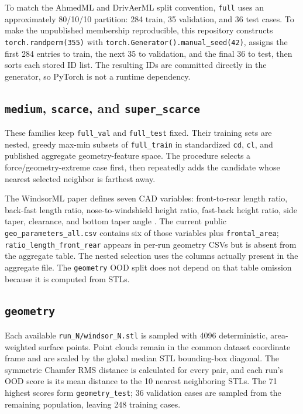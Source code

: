 \documentclass[10pt]{article}
\newcommand{\code}[1]{\texttt{#1}}
\newcommand{\splitkey}[1]{\texttt{#1}}
\begin{document}
To match the AhmedML and DrivAerML split convention, \splitkey{full} uses an
approximately 80/10/10 partition: 284 train, 35 validation, and 36 test cases.
To make the unpublished membership reproducible, this repository constructs
\code{torch.randperm(355)} with \code{torch.Generator().manual\_seed(42)}, assigns
the first 284 entries to train, the next 35 to validation, and the final 36 to
test, then sorts each stored ID list. The resulting IDs are committed directly
in the generator, so PyTorch is not a runtime dependency.

\subsection*{\splitkey{medium}, \splitkey{scarce}, and \splitkey{super\_scarce}}

These families keep \splitkey{full\_val} and \splitkey{full\_test} fixed. Their
training sets are nested, greedy max-min subsets of \splitkey{full\_train} in
standardized \code{cd}, \code{cl}, and published aggregate geometry-feature
space. The procedure selects a force/geometry-extreme case first, then repeatedly
adds the candidate whose nearest selected neighbor is farthest away.

The WindsorML paper defines seven CAD variables: front-to-rear length ratio,
back-fast length ratio, nose-to-windshield height ratio, fast-back height ratio,
side taper, clearance, and bottom taper angle \cite{windsorml_paper}. The current
public \code{geo\_parameters\_all.csv} contains six of those variables plus
\code{frontal\_area}; \code{ratio\_length\_front\_rear} appears in per-run geometry
CSVs but is absent from the aggregate table. The nested selection uses the
columns actually present in the aggregate file. The \splitkey{geometry} OOD
split does not depend on that table omission because it is computed from STLs.

\subsection*{\splitkey{geometry}}

Each available \code{run\_N/windsor\_N.stl} is sampled with 4096 deterministic,
area-weighted surface points. Point clouds remain in the common dataset
coordinate frame and are scaled by the global median STL bounding-box diagonal.
The symmetric Chamfer RMS distance is calculated for every pair, and each run's
OOD score is its mean distance to the 10 nearest neighboring STLs. The 71
highest scores form \splitkey{geometry\_test}; 36 validation cases are sampled
from the remaining population, leaving 248 training cases.
\end{document}
